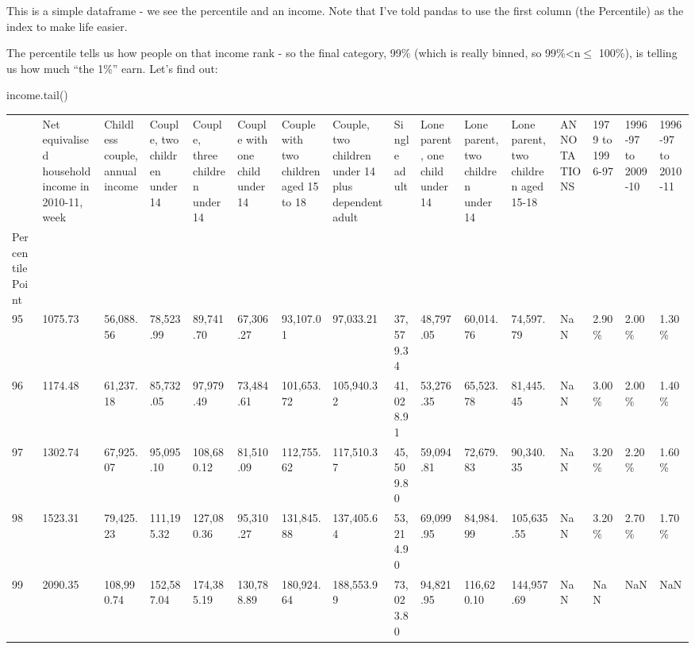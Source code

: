 \documentclass[
  letterpaper,
  DIV=11,
  numbers=noendperiod]{scrreprt}
\newenvironment{Shaded}{\begin{snugshade}}{\end{snugshade}}
\newcommand{\NormalTok}[1]{\textcolor[rgb]{0.00,0.23,0.31}{#1}}
\begin{document}
This is a simple dataframe - we see the percentile and an income. Note
that I've told pandas to use the first column (the Percentile) as the
index to make life easier.

The percentile tells us how people on that income rank - so the final
category, 99\% (which is really binned, so 99\%\textless n\(\leq\)
100\%), is telling us how much ``the 1\%'' earn. Let's find out:

\begin{Shaded}
\begin{Highlighting}[]
\NormalTok{income.tail()}
\end{Highlighting}
\end{Shaded}

\begin{longtable}[]{@{}llllllllllllllll@{}}
\toprule()
& Net equivalised household income in 2010-11, week & Childless couple,
annual income & Couple, two children under 14 & Couple, three children
under 14 & Couple with one child under 14 & Couple with two children
aged 15 to 18 & Couple, two children under 14 plus dependent adult &
Single adult & Lone parent, one child under 14 & Lone parent, two
children under 14 & Lone parent, two children aged 15-18 & ANNOTATIONS &
1979 to 1996-97 & 1996-97 to 2009-10 & 1996-97 to 2010-11 \\
Percentile Point & & & & & & & & & & & & & & & \\
\midrule()
\endhead
95 & 1075.73 & 56,088.56 & 78,523.99 & 89,741.70 & 67,306.27 & 93,107.01
& 97,033.21 & 37,579.34 & 48,797.05 & 60,014.76 & 74,597.79 & NaN &
2.90\% & 2.00\% & 1.30\% \\
96 & 1174.48 & 61,237.18 & 85,732.05 & 97,979.49 & 73,484.61 &
101,653.72 & 105,940.32 & 41,028.91 & 53,276.35 & 65,523.78 & 81,445.45
& NaN & 3.00\% & 2.00\% & 1.40\% \\
97 & 1302.74 & 67,925.07 & 95,095.10 & 108,680.12 & 81,510.09 &
112,755.62 & 117,510.37 & 45,509.80 & 59,094.81 & 72,679.83 & 90,340.35
& NaN & 3.20\% & 2.20\% & 1.60\% \\
98 & 1523.31 & 79,425.23 & 111,195.32 & 127,080.36 & 95,310.27 &
131,845.88 & 137,405.64 & 53,214.90 & 69,099.95 & 84,984.99 & 105,635.55
& NaN & 3.20\% & 2.70\% & 1.70\% \\
99 & 2090.35 & 108,990.74 & 152,587.04 & 174,385.19 & 130,788.89 &
180,924.64 & 188,553.99 & 73,023.80 & 94,821.95 & 116,620.10 &
144,957.69 & NaN & NaN & NaN & NaN \\
\bottomrule()
\end{longtable}
\end{document}
